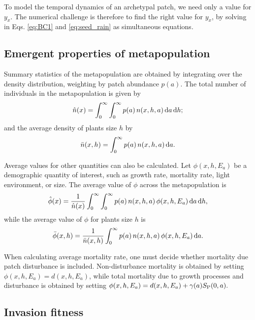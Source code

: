 \documentclass[10pt,twoside]{article}
\begin{document}
To model the temporal dynamics of an archetypal patch, we need only a
value for \(y_x\). The numerical challenge is therefore to find the
right value for \(y_x\), by solving in Eqs. \ref{eq:BC1} and
\ref{eq:seed_rain} as simultaneous equations.

\subsection{Emergent properties of
metapopulation}\label{emergent-properties-of-metapopulation}

Summary statistics of the metapopulation are obtained by integrating
over the density distribution, weighting by patch abundance \(p(a)\).
The total number of individuals in the metapopulation is given by
\begin{equation}
  \hat{n}(x) = \int_{0}^{\infty} \int_{0}^{\infty}p(a) \, n(x,h,a) \, {\rm d}a \, {\rm d}h;
\end{equation}
and the average density of plants size \(h\) by
\begin{equation}
  \bar{n}(x,h) = \int_{0}^{\infty}p(a) \, n(x,h,a) \, {\rm d}a.
\end{equation}

Average values for other quantities can also be calculated. Let
\(\phi(x, h, E_a)\) be a demographic quantity of interest, such as
growth rate, mortality rate, light environment, or size. The average
value of \(\phi\) across the metapopulation is
\begin{equation}
  \hat{\phi}(x) = \frac1{\hat{n}(x) }\int_{0}^{\infty} \int_{0}^{\infty} p(a) \, n(x,h,a) \, \phi(x,h,E_a) \, {\rm d}a \, {\rm d}h,
\end{equation}
while the average value of \(\phi\) for plants size \(h\) is
\begin{equation}\bar{\phi}(x,h) = \frac1{\bar{n}(x,h) }\int_{0}^{\infty}p(a)  \, n(x,h,a) \, \phi(x,h,E_a)\, {\rm d}a.
\end{equation}

When calculating average mortality rate, one must decide whether
mortality due patch disturbance is included. Non-disturbance mortality
is obtained by setting \(\phi(x,h, E_a) = d(x,h,E_a)\), while total
mortality due to growth processes and disturbance is obtained by setting
\(\phi(x,h, E_a) = d(x,h,E_a)+ \gamma(a) S_{\rm P}(0,a).\)

\subsection{Invasion fitness}\label{invasion-fitness}
\end{document}
